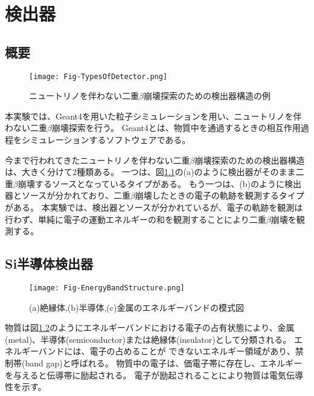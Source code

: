 \documentclass[a4paper,10pt]{jreport}
\begin{document}
\chapter{検出器}



\section{概要}

\begin{figure}[H]
	\center
	\texttt{[image: Fig-TypesOfDetector.png]}
	\caption{ニュートリノを伴わない二重$\beta$崩壊探索のための検出器構造の例} \label{Fig-TyepseOfDetector}
\end{figure}

本実験では、Geant4を用いた粒子シミュレーションを用い、ニュートリノを伴わない二重$\beta$崩壊探索を行う。
Geant4とは、物質中を通過するときの相互作用過程をシミュレーションするソフトウェアである。

今まで行われてきたニュートリノを伴わない二重$\beta$崩壊探索のための検出器構造は、大きく分けて2種類ある。
一つは、図\ref{Fig-TyepseOfDetector}の(a)のように検出器がそのまま二重$\beta$崩壊するソースとなっているタイプがある。
もう一つは、(b)のように検出器とソースが分かれており、二重$\beta$崩壊したときの電子の軌跡を観測するタイプがある。
本実験では、検出器とソースが分かれているが、電子の軌跡を観測は行わず、単純に電子の運動エネルギーの和を観測することにより二重$\beta$崩壊を観測する。



\section{Si半導体検出器}

\begin{figure}[H]
	\center
	\texttt{[image: Fig-EnergyBandStructure.png]}
	\caption{(a)絶縁体,(b)半導体,(c)金属のエネルギーバンドの模式図\cite{TUS_text}} \label{Fig-SiliconSemiconductorDetector}
\end{figure}

物質は図\ref{Fig-SiliconSemiconductorDetector}のようにエネルギーバンドにおける電子の占有状態により、金属(metal)、半導体(semiconductor)または絶縁体(insulator)として分類される。
エネルギーバンドには、電子の占めることが できないエネルギー領域があり、禁制帯(band gap)と呼ばれる。
物質中の電子は、価電子帯に存在し、エネルギーを与えると伝導帯に励起される。
電子が励起されることにより物質は電気伝導性を示す。
\end{document}
